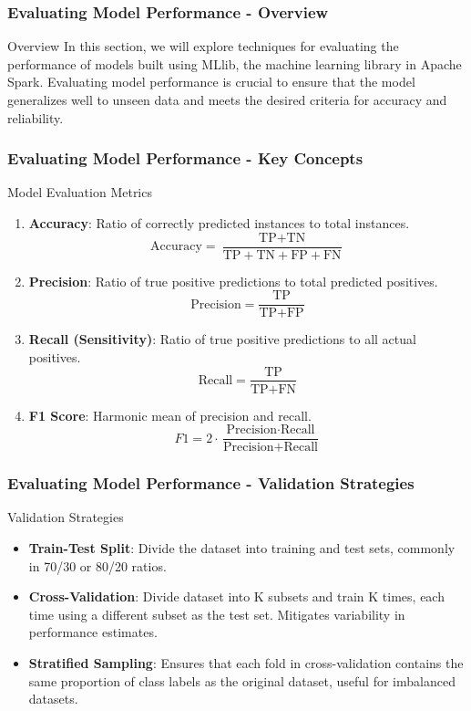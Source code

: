 \documentclass[aspectratio=169]{beamer}
\begin{document}
\begin{frame}
    \frametitle{Evaluating Model Performance - Overview}
    \begin{block}{Overview}
        In this section, we will explore techniques for evaluating the performance of models built using MLlib, the machine learning library in Apache Spark. 
        Evaluating model performance is crucial to ensure that the model generalizes well to unseen data and meets the desired criteria for accuracy and reliability.
    \end{block}
\end{frame}

\begin{frame}
    \frametitle{Evaluating Model Performance - Key Concepts}
    \begin{block}{Model Evaluation Metrics}
        \begin{enumerate}
            \item \textbf{Accuracy}: Ratio of correctly predicted instances to total instances.
            \[
            \text{Accuracy} = \frac{\text{TP} + \text{TN}}{\text{TP} + \text{TN} + \text{FP} + \text{FN}}
            \]
            \item \textbf{Precision}: Ratio of true positive predictions to total predicted positives.
            \[
            \text{Precision} = \frac{\text{TP}}{\text{TP} + \text{FP}}
            \]
            \item \textbf{Recall (Sensitivity)}: Ratio of true positive predictions to all actual positives.
            \[
            \text{Recall} = \frac{\text{TP}}{\text{TP} + \text{FN}}
            \]
            \item \textbf{F1 Score}: Harmonic mean of precision and recall.
            \[
            F1 = 2 \cdot \frac{\text{Precision} \cdot \text{Recall}}{\text{Precision} + \text{Recall}}
            \]
        \end{enumerate}
    \end{block}
\end{frame}

\begin{frame}
    \frametitle{Evaluating Model Performance - Validation Strategies}
    \begin{block}{Validation Strategies}
        \begin{itemize}
            \item \textbf{Train-Test Split}: Divide the dataset into training and test sets, commonly in 70/30 or 80/20 ratios.
            \item \textbf{Cross-Validation}: Divide dataset into K subsets and train K times, each time using a different subset as the test set. Mitigates variability in performance estimates.
            \item \textbf{Stratified Sampling}: Ensures that each fold in cross-validation contains the same proportion of class labels as the original dataset, useful for imbalanced datasets.
        \end{itemize}
    \end{block}
\end{frame}
\end{document}
